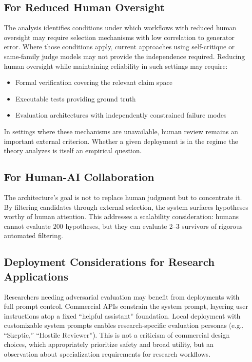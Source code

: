 \documentclass[11pt]{article}
\begin{document}
\subsection{For Reduced Human Oversight}

The analysis identifies conditions under which workflows with reduced human oversight may
require selection mechanisms with low correlation to generator error. Where those conditions
apply, current approaches using self-critique or same-family judge models may not provide
the independence required. Reducing human oversight while maintaining reliability in such
settings may require:
\begin{itemize}
    \item Formal verification covering the relevant claim space
    \item Executable tests providing ground truth
    \item Evaluation architectures with independently constrained failure modes
\end{itemize}

In settings where these mechanisms are unavailable, human review remains an important
external criterion. Whether a given deployment is in the regime the theory analyzes is
itself an empirical question.

\subsection{For Human-AI Collaboration}

The architecture's goal is not to replace human judgment but to concentrate it. By filtering
candidates through external selection, the system surfaces hypotheses worthy of human
attention. This addresses a scalability consideration: humans cannot evaluate 200 hypotheses,
but they can evaluate 2--3 survivors of rigorous automated filtering.

\subsection{Deployment Considerations for Research Applications}

Researchers needing adversarial evaluation may benefit from deployments with full prompt
control. Commercial APIs constrain the system prompt, layering user instructions atop a
fixed ``helpful assistant'' foundation. Local deployment with customizable system prompts
enables research-specific evaluation personas (e.g., ``Skeptic,'' ``Hostile Reviewer'').
This is not a criticism of commercial design choices, which appropriately prioritize safety
and broad utility, but an observation about specialization requirements for research workflows.
\end{document}
